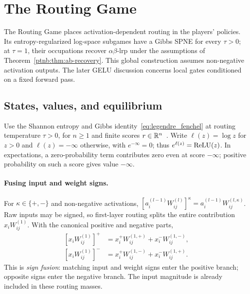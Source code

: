 \section{The Routing Game}\label{ptnb:sec:routing}\label{subsec:routing_game_def}\label{ptnb:app:routing-formal}

The Routing Game places activation-dependent routing in the players' policies. Its entropy-regularized log-space subgames have a Gibbs SPNE for every $\tau>0$; at $\tau=1$, their occupations recover $\alpha\beta$-\ac{lrp} under the assumptions of Theorem~\ref{ptnb:thm:ab-recovery}. This global construction assumes non-negative activation outputs. The later GELU discussion concerns local gates conditioned on a fixed forward pass.

\subsection{States, values, and equilibrium}\label{ptnb:app:routing-kernel}

Use the Shannon entropy and Gibbs identity~\eqref{eq:legendre_fenchel} at routing temperature $\tau>0$,
for $n\geq1$ and finite scores $r\in\mathbb{R}^n$~\parencite{Geist2019regularized}.
Write $\ell(z)=\log z$ for $z>0$ and $\ell(z)=-\infty$ otherwise, with $e^{-\infty}=0$; thus $e^{\ell(z)}=\text{ReLU}(z)$. In expectations, a zero-probability term contributes zero even at score $-\infty$; positive probability on such a score gives value $-\infty$.

\paragraph{Fusing input and weight signs.}
For $\kappa\in\{+,-\}$ and non-negative activations, $[a_i^{(l-1)}W_{ij}^{(l)}]^\kappa=a_i^{(l-1)}W_{ij}^{(l,\kappa)}$. Raw inputs may be signed, so first-layer routing splits the entire contribution $x_iW_{ij}^{(1)}$. With the canonical positive and negative parts,
\[
\begin{aligned}
 [x_iW_{ij}^{(1)}]^+&=x_i^+W_{ij}^{(1,+)}+x_i^-W_{ij}^{(1,-)},\\
 [x_iW_{ij}^{(1)}]^-&=x_i^+W_{ij}^{(1,-)}+x_i^-W_{ij}^{(1,+)}.
\end{aligned}
\]
This is \emph{sign fusion}: matching input and weight signs enter the positive branch; opposite signs enter the negative branch. The input magnitude is already included in these routing masses.

